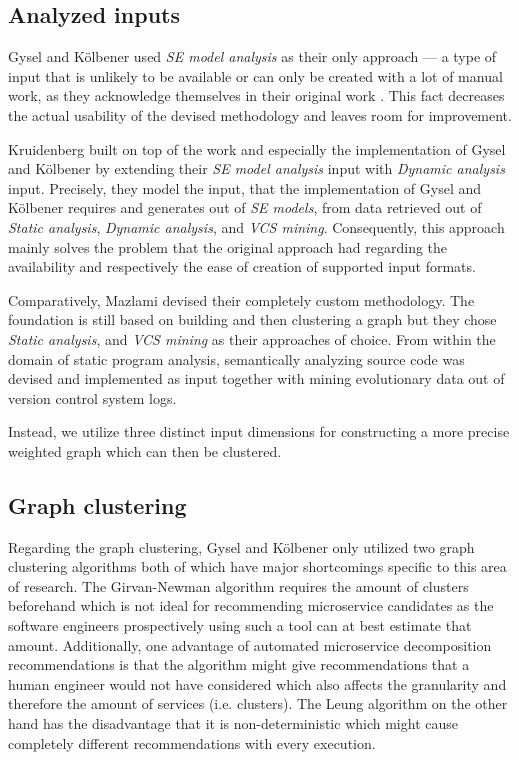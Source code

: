 \documentclass[12pt,a4paper]{report}
\begin{document}
\subsection{Analyzed inputs}

Gysel and K{\"o}lbener used \textit{SE model analysis} as their only approach ---
a type of input that is unlikely to be available or can only
be created with a lot of manual work, as they acknowledge
themselves in their original work \cite{gysel2016service}.
This fact decreases the actual usability of the devised methodology and leaves
room for improvement.

Kruidenberg \cite{kruidenberg2018monoliths} built on top of the work and
especially the implementation of Gysel and K{\"o}lbener by extending their
\textit{SE model analysis} input with \textit{Dynamic analysis} input.
Precisely, they model the input, that the implementation of Gysel and K{\"o}lbener
requires and generates out of \textit{SE models}, from data retrieved
out of \textit{Static analysis}, \textit{Dynamic analysis}, and \textit{VCS mining}.
Consequently, this approach mainly solves the problem that the original approach
had regarding the availability and respectively the ease of creation
of supported input formats.

Comparatively, Mazlami \cite{mazlami2017extraction} devised their completely
custom methodology. The foundation is still based on building and then clustering
a graph but they chose \textit{Static analysis}, and \textit{VCS mining} as
their approaches of choice. From within the domain of static program analysis,
semantically analyzing source code was devised and implemented as input together
with mining evolutionary data out of version control system logs.

Instead, we utilize three distinct input dimensions for constructing
a more precise weighted graph which can then be clustered.


\subsection{Graph clustering}

Regarding the graph clustering, Gysel and K{\"o}lbener \cite{gysel2016service}
only utilized two graph clustering algorithms both of which have major
shortcomings specific to this area of research.
The Girvan-Newman algorithm \cite{girvan2002community} requires the
amount of clusters beforehand which is not ideal for recommending
microservice candidates as the software engineers prospectively using
such a tool can at best estimate that amount.
Additionally, one advantage of automated microservice decomposition recommendations
is that the algorithm might give recommendations that a human engineer would
not have considered which also affects the granularity and therefore the
amount of services (i.e. clusters).
The Leung algorithm \cite{leung2009community} on the other hand has the
disadvantage that it is non\hyp deterministic which might cause completely
different recommendations with every execution.
\end{document}
